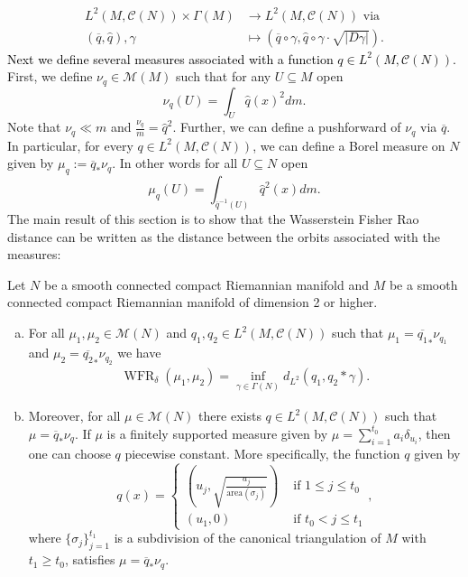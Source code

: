 \documentclass[final,hidelinks,onefignum,onetabnum]{siamart220329}
\newcommand{\WFR}{\operatorname{WFR}}
\begin{document}
\begin{align*}
    L^2(M,\mathcal{C}(N))\times\Gamma(M)&\to L^2(M,\mathcal{C}(N)) \text{ via }\\
    (\overline{q},\hat{q}),\gamma&\mapsto \left(\overline{q}\circ \gamma,\hat{q}\circ\gamma \cdot \sqrt{|D\gamma|}\right).
\end{align*}
\textcolor{black}{Next we define several measures associated with a function $q\in L^2(M,\mathcal{C}(N))$.} First, we define $\nu_q\in\mathcal{M}(M)$ such that for any $U\subseteq M$ open \[\nu_q(U)=\int_{U}\hat{q}(x)^2dm.\] 
Note that $\nu_q\ll m$ and $\frac{\nu_q}{m}=\hat{q}^2$. Further, we can define a pushforward of $\nu_q$ via $\overline{q}$. In particular, for every $q\in L^2(M,\mathcal{C}(N))$, we can define a Borel measure on $N$ given by $\mu_q:=\overline{q}_*\nu_q.$ In other words for all $U\subseteq N$ open \[\mu_q(U)=\int_{\overline{q}^{-1}(U)} \hat{q}^2(x)dm.\]
The main result of this section is to show that the Wasserstein Fisher Rao distance can be written as the distance between the orbits associated with the measures:
\begin{theorem}\label{thm:cone_iso}
Let $N$ be a smooth connected compact Riemannian manifold and $M$ be a smooth connected compact Riemannian manifold of dimension 2 or higher.
\begin{enumerate}[a.)]
\item For all $\mu_1,\mu_2\in\mathcal{M}(N)$ and $q_1,q_2\in L^2(M,\mathcal{C}(N))$ such that $\mu_1=\overline{q_1}_*\nu_{q_1}$ and $\mu_2=\overline{q_2}_*\nu_{q_2}$ we have
\begin{align*}
    \WFR_\delta(\mu_1,\mu_2)= \inf\limits_{\gamma\in\Gamma(N)}d_{L^2}(q_1,q_2*\gamma).
\end{align*}
\item Moreover, for all $\mu \in \mathcal{M}(N)$ there exists $q\in L^2(M,\mathcal{C}(N))$ such that $\mu=\overline{q}_*\nu_q$. If $\mu$ is a finitely supported measure given by $\mu=\sum_{i=1}^{t_0}a_i\delta_{u_i}$, then one can choose $q$ piecewise constant. More specifically, the function $q$ given by
\[q(x)=\begin{cases}\left(u_j,\sqrt{\frac{a_j}{\text{area}(\sigma_j)}}\right)&\text{ if } 1\leq j\leq t_0\\
(u_1,0)& \text{ if } t_0< j\leq t_1\end{cases},\]
where $\{\sigma_j\}_{j=1}^{t_1}$ is a subdivision of the canonical triangulation of $M$ with $t_1\geq t_0$, satisfies $\mu=\overline{q}_*\nu_q$. 
\end{enumerate}
\end{theorem}
\end{document}
